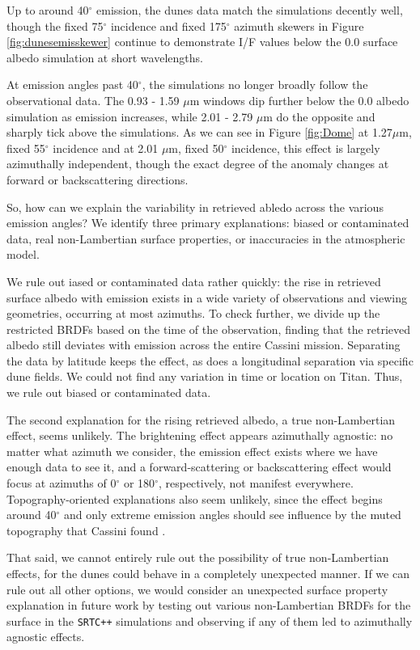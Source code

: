 \documentclass[twocolumn,linenumbers]{aastex631}
\def\srtcppspace{{\tt SRTC++} }
\begin{document}
Up to around 40$^{\circ}$ emission, the dunes data match the simulations decently well, though the fixed 75$^{\circ}$ incidence and fixed 175$^{\circ}$ azimuth skewers in Figure \ref{fig:dunesemisskewer} continue to demonstrate I/F values below the 0.0 surface albedo simulation at short wavelengths.

At emission angles past 40$^{\circ}$, the simulations no longer broadly follow the observational data. The 0.93 - 1.59 $\mu$m windows dip further below the 0.0 albedo simulation as emission increases, while 2.01 - 2.79 $\mu$m do the opposite and sharply tick above the simulations. As we can see in Figure \ref{fig:Dome} at 1.27$\mu$m, fixed 55$^{\circ}$ incidence and at 2.01 $\mu$m, fixed 50$^{\circ}$ incidence, this effect is largely azimuthally independent, though the exact degree of the anomaly changes at forward or backscattering directions.

So, how can we explain the variability in retrieved abledo across the various emission angles? We identify three primary explanations: biased or contaminated data, real non-Lambertian surface properties, or inaccuracies in the atmospheric model.

We rule out iased or contaminated data rather quickly: the rise in retrieved surface albedo with emission exists in a wide variety of observations and viewing geometries, occurring at most azimuths. To check further, we divide up the restricted BRDFs based on the time of the observation, finding that the retrieved albedo still deviates with emission across the entire Cassini mission. Separating the data by latitude keeps the effect, as does a longitudinal separation via specific dune fields. We could not find any variation in time or location on Titan. Thus, we rule out biased or contaminated data.

The second explanation for the rising retrieved albedo, a true non-Lambertian effect, seems unlikely.  The brightening effect appears azimuthally agnostic: no matter what azimuth we consider, the emission effect exists where we have enough data to see it, and a forward-scattering or backscattering effect would focus at azimuths of 0$^{\circ}$ or 180$^{\circ}$, respectively, not manifest everywhere. Topography-oriented explanations also seem unlikely, since the effect begins around 40$^{\circ}$ and only extreme emission angles should see influence by the muted topography that Cassini found \citep{Corlies2017}.

That said, we cannot entirely rule out the possibility of true non-Lambertian effects, for the dunes could behave in a completely unexpected manner. If we can rule out all other options, we would consider an unexpected surface property explanation in future work by testing out various non-Lambertian BRDFs for the surface in the \srtcppspace simulations and observing if any of them led to azimuthally agnostic effects.
\end{document}
